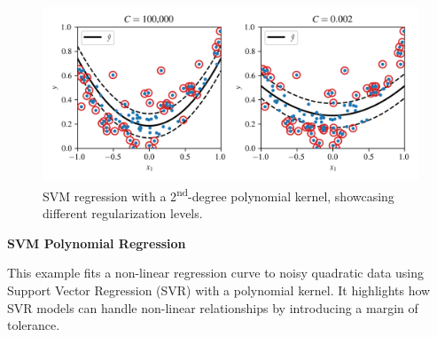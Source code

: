 \documentclass[12pt,letter]{article}
\begin{document}
\begin{figure}[H]
	\centering
	\includegraphics[width=6.5in]{../figures/SVM_regression_2nd_degree.png}
	\caption{SVM regression with a 2\textsuperscript{nd}-degree polynomial kernel, showcasing different regularization levels.}
	\label{fig:SVM_regression_2nd_degree}
\end{figure}


\begin{example}
\textbf{SVM Polynomial Regression}

This example fits a non-linear regression curve to noisy quadratic data using Support Vector Regression (SVR) with a polynomial kernel. It highlights how SVR models can handle non-linear relationships by introducing a margin of tolerance.
\end{example}

\pagebreak










\end{document}
